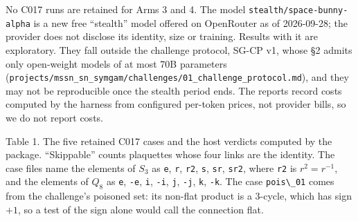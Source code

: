 \documentclass[
  11pt,
]{article}
\newcommand{\passthrough}[1]{#1}
\begin{document}
No C017 runs are retained for Arms 3 and 4. The model
\nolinkurl{stealth/space-bunny-alpha} is a new free ``stealth'' model
offered on OpenRouter as of 2026-09-28; the provider does not disclose
its identity, size or training. Results with it are exploratory. They
fall outside the challenge protocol, SG-CP v1, whose §2 admits only
open-weight models of at most 70B parameters
(\nolinkurl{projects/mssn_sn_symgam/challenges/01_challenge_protocol.md}),
and they may not be reproducible once the stealth period ends. The
reports record costs computed by the harness from configured per-token
prices, not provider bills, so we do not report costs.

Table 1. The five retained C017 cases and the host verdicts computed by
the package. ``Skippable'' counts plaquettes whose four links are the
identity. The case files name the elements of \(S_3\) as
\passthrough{\lstinline!e!}, \passthrough{\lstinline!r!},
\passthrough{\lstinline!r2!}, \passthrough{\lstinline!s!},
\passthrough{\lstinline!sr!}, \passthrough{\lstinline!sr2!}, where
\passthrough{\lstinline!r2!} is \(r^2 = r^{-1}\), and the elements of
\(Q_8\) as \passthrough{\lstinline!e!}, \passthrough{\lstinline!-e!},
\passthrough{\lstinline!i!}, \passthrough{\lstinline!-i!},
\passthrough{\lstinline!j!}, \passthrough{\lstinline!-j!},
\passthrough{\lstinline!k!}, \passthrough{\lstinline!-k!}. The case
\passthrough{\lstinline!pois\_01!} comes from the challenge's poisoned
set: its non-flat product is a 3-cycle, which has sign \(+1\), so a test
of the sign alone would call the connection flat.
\end{document}
